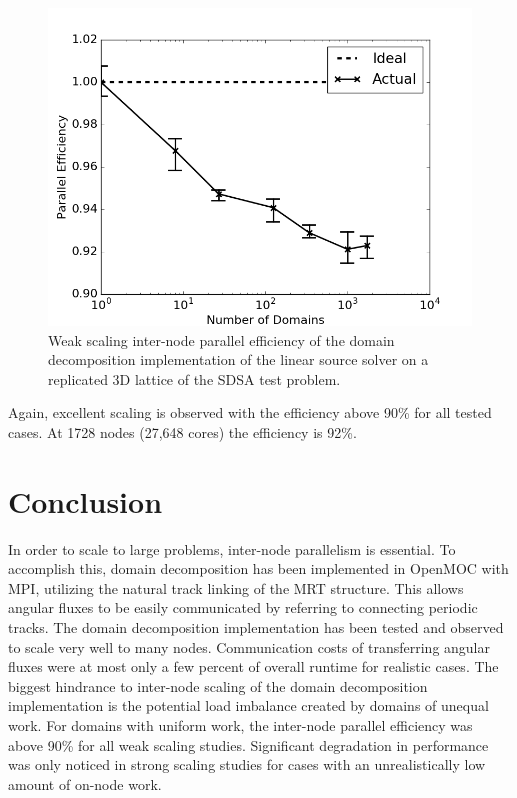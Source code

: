 \begin{figure}[h!]
	\centering
	\includegraphics[width=0.6\linewidth]{figures/DD/dd-ws-3D.png}
	\caption[]{Weak scaling inter-node parallel efficiency of the domain decomposition implementation of the linear source solver on a replicated 3D lattice of the SDSA test problem.}
	\label{fig:dd-ws-3D}
\end{figure}

Again, excellent scaling is observed with the efficiency above 90\% for all tested cases. At 1728 nodes (27,648 cores) the efficiency is 92\%.

\newpage
\section{Conclusion}
\label{sec:dd-conclusion}

In order to scale to large problems, inter-node parallelism is essential. To accomplish this, domain decomposition has been implemented in OpenMOC with \ac{MPI}, utilizing the natural track linking of the \ac{MRT} structure. This allows angular fluxes to be easily communicated by referring to connecting periodic tracks. The domain decomposition implementation has been tested and observed to scale very well to many nodes. Communication costs of transferring angular fluxes were at most only a few percent of overall runtime for realistic cases. The biggest hindrance to inter-node scaling of the domain decomposition implementation is the potential load imbalance created by domains of unequal work. For domains with uniform work, the inter-node parallel efficiency was above 90\% for all weak scaling studies. Significant degradation in performance was only noticed in strong scaling studies for cases with an unrealistically low amount of on-node work.

